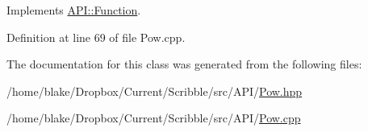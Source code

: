 Implements \hyperlink{class_a_p_i_1_1_function_ae56761ad4c849c05e12cb4cd02583c77}{A\-P\-I\-::\-Function}.



Definition at line 69 of file Pow.\-cpp.



The documentation for this class was generated from the following files\-:\begin{DoxyCompactItemize}
\item 
/home/blake/\-Dropbox/\-Current/\-Scribble/src/\-A\-P\-I/\hyperlink{_pow_8hpp}{Pow.\-hpp}\item 
/home/blake/\-Dropbox/\-Current/\-Scribble/src/\-A\-P\-I/\hyperlink{_pow_8cpp}{Pow.\-cpp}\end{DoxyCompactItemize}
